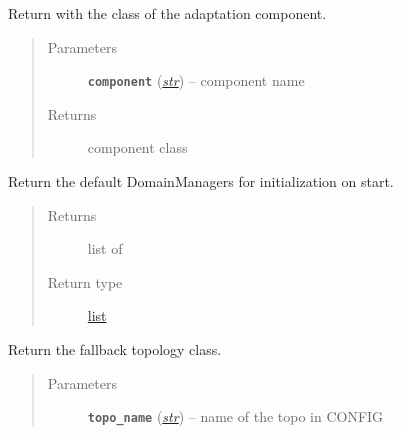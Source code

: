 \documentclass[letterpaper,10pt,english]{sphinxmanual}
\begin{document}
\begin{fulllineitems}

\begin{fulllineitems}
\label{util/misc:escape.util.misc.ESCAPEConfig.get_domain_component}
Return with the class of the adaptation component.
\begin{quote}\begin{description}
\item[{Parameters}] \leavevmode
\textbf{\texttt{component}} (\href{https://docs.python.org/2.7/library/functions.html\#str}{\emph{str}}) -- component name

\item[{Returns}] \leavevmode
component class

\end{description}\end{quote}

\end{fulllineitems}


\begin{fulllineitems}
\label{util/misc:escape.util.misc.ESCAPEConfig.get_default_mgrs}
Return the default DomainManagers for initialization on start.
\begin{quote}\begin{description}
\item[{Returns}] \leavevmode
list of {\hyperref[util/adapter:escape.util.adapter.AbstractDomainManager]{\emph{}}}

\item[{Return type}] \leavevmode
\href{https://docs.python.org/2.7/library/functions.html\#list}{list}

\end{description}\end{quote}

\end{fulllineitems}


\begin{fulllineitems}
\label{util/misc:escape.util.misc.ESCAPEConfig.get_fallback_topology}
Return the fallback topology class.
\begin{quote}\begin{description}
\item[{Parameters}] \leavevmode
\textbf{\texttt{topo\_name}} (\href{https://docs.python.org/2.7/library/functions.html\#str}{\emph{str}}) -- name of the topo in CONFIG


\end{description}
\end{quote}
\end{fulllineitems}
\end{fulllineitems}
\end{document}
